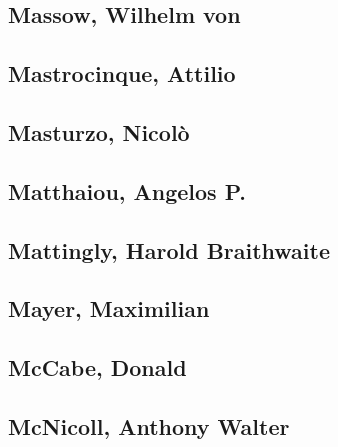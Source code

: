
\subsection[Massow, Wilhelm von (1)]{Massow, Wilhelm von}

\subsection[Mastrocinque, Attilio (2)]{Mastrocinque, Attilio}


\subsection[Masturzo, Nicolò (2)]{Masturzo, Nicolò}


\subsection[Matthaiou, Angelos P. (1)]{Matthaiou, Angelos P.}

\subsection[Mattingly, Harold Braithwaite (1)]{Mattingly, Harold Braithwaite}

\subsection[Mayer, Maximilian (1)]{Mayer, Maximilian}

\subsection[McCabe, Donald (1)]{McCabe, Donald}

\subsection[McNicoll, Anthony Walter (1)]{McNicoll, Anthony Walter}

